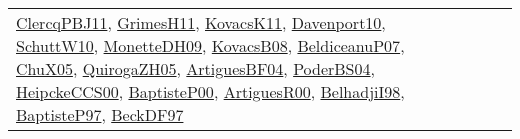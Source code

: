 {\begin{longtable}{lp{3cm}>{\raggedright}p{6cm}>{\raggedright}p{6cm}p{8cm}}
\href{papers/ClercqPBJ11.pdf}{ClercqPBJ11}\cite{ClercqPBJ11}, \href{papers/GrimesH11.pdf}{GrimesH11}\cite{GrimesH11}, \href{articles/KovacsK11.pdf}{KovacsK11}\cite{KovacsK11}, \href{papers/Davenport10.pdf}{Davenport10}\cite{Davenport10}, \href{papers/SchuttW10.pdf}{SchuttW10}\cite{SchuttW10}, \href{papers/MonetteDH09.pdf}{MonetteDH09}\cite{MonetteDH09}, \href{articles/KovacsB08.pdf}{KovacsB08}\cite{KovacsB08}, \href{papers/BeldiceanuP07.pdf}{BeldiceanuP07}\cite{BeldiceanuP07}, \href{papers/ChuX05.pdf}{ChuX05}\cite{ChuX05}, \href{papers/QuirogaZH05.pdf}{QuirogaZH05}\cite{QuirogaZH05}, \href{papers/ArtiguesBF04.pdf}{ArtiguesBF04}\cite{ArtiguesBF04}, \href{articles/PoderBS04.pdf}{PoderBS04}\cite{PoderBS04}, \href{articles/HeipckeCCS00.pdf}{HeipckeCCS00}\cite{HeipckeCCS00}, \href{articles/BaptisteP00.pdf}{BaptisteP00}\cite{BaptisteP00}, \href{articles/ArtiguesR00.pdf}{ArtiguesR00}\cite{ArtiguesR00}, \href{articles/BelhadjiI98.pdf}{BelhadjiI98}\cite{BelhadjiI98}, \href{papers/BaptisteP97.pdf}{BaptisteP97}\cite{BaptisteP97}, \href{papers/BeckDF97.pdf}{BeckDF97}\cite{BeckDF97}\\

\end{longtable}}
